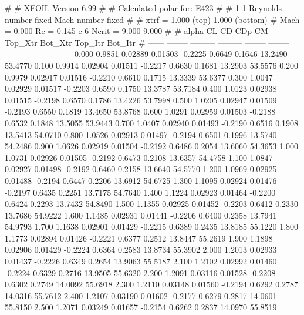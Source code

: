 #  
#       XFOIL         Version 6.99
#  
# Calculated polar for: E423                                            
#  
# 1 1 Reynolds number fixed          Mach number fixed         
#  
# xtrf =   1.000 (top)        1.000 (bottom)  
# Mach =   0.000     Re =     0.145 e 6     Ncrit =   9.000  9.000
#  
#   alpha    CL        CD       CDp       CM     Top_Xtr  Bot_Xtr  Top_Itr  Bot_Itr
#  ------ -------- --------- --------- -------- -------- -------- -------- --------
   0.000   0.9851   0.02889   0.01503  -0.2225   0.6649   0.1646  13.2490  53.4770
   0.100   0.9914   0.02904   0.01511  -0.2217   0.6630   0.1681  13.2903  53.5576
   0.200   0.9979   0.02917   0.01516  -0.2210   0.6610   0.1715  13.3339  53.6377
   0.300   1.0047   0.02929   0.01517  -0.2203   0.6590   0.1750  13.3787  53.7184
   0.400   1.0123   0.02938   0.01515  -0.2198   0.6570   0.1786  13.4226  53.7998
   0.500   1.0205   0.02947   0.01509  -0.2193   0.6550   0.1819  13.4650  53.8768
   0.600   1.0291   0.02959   0.01503  -0.2188   0.6532   0.1848  13.5055  53.9443
   0.700   1.0407   0.02940   0.01493  -0.2190   0.6516   0.1908  13.5413  54.0710
   0.800   1.0526   0.02913   0.01497  -0.2194   0.6501   0.1996  13.5740  54.2486
   0.900   1.0626   0.02919   0.01504  -0.2192   0.6486   0.2054  13.6060  54.3653
   1.000   1.0731   0.02926   0.01505  -0.2192   0.6473   0.2108  13.6357  54.4758
   1.100   1.0847   0.02927   0.01498  -0.2192   0.6460   0.2158  13.6640  54.5770
   1.200   1.0969   0.02925   0.01488  -0.2194   0.6447   0.2206  13.6912  54.6725
   1.300   1.1095   0.02924   0.01476  -0.2197   0.6435   0.2251  13.7175  54.7640
   1.400   1.1224   0.02923   0.01464  -0.2200   0.6424   0.2293  13.7432  54.8490
   1.500   1.1355   0.02925   0.01452  -0.2203   0.6412   0.2330  13.7686  54.9222
   1.600   1.1485   0.02931   0.01441  -0.2206   0.6400   0.2358  13.7941  54.9793
   1.700   1.1638   0.02901   0.01429  -0.2215   0.6389   0.2435  13.8185  55.1220
   1.800   1.1773   0.02894   0.01426  -0.2221   0.6377   0.2512  13.8447  55.2619
   1.900   1.1898   0.02906   0.01429  -0.2224   0.6364   0.2583  13.8734  55.3902
   2.000   1.2013   0.02933   0.01437  -0.2226   0.6349   0.2654  13.9063  55.5187
   2.100   1.2102   0.02992   0.01460  -0.2224   0.6329   0.2716  13.9505  55.6320
   2.200   1.2091   0.03116   0.01528  -0.2208   0.6302   0.2749  14.0092  55.6918
   2.300   1.2110   0.03148   0.01560  -0.2194   0.6292   0.2787  14.0316  55.7612
   2.400   1.2107   0.03190   0.01602  -0.2177   0.6279   0.2817  14.0601  55.8150
   2.500   1.2071   0.03249   0.01657  -0.2154   0.6262   0.2837  14.0970  55.8519
